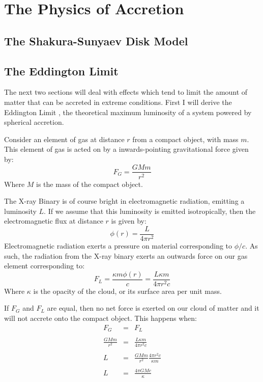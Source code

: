 \chapter{The Physics of Accretion}

\label{sec:PhysAcc}

\section{The Shakura-Sunyaev Disk Model}

\section{The Eddington Limit}

\par The next two sections will deal with effects which tend to limit the amount of matter that can be accreted in extreme conditions.  First I will derive the Eddington Limit \citep{xxxxx}, the theoretical maximum luminosity of a system powered by spherical accretion.
\par Consider an element of gas at distance $r$ from a compact object, with mass $m$.  This element of gas is acted on by a inwards-pointing gravitational force given by:
\begin{equation}
F_G=\frac{GMm}{r^2}
\end{equation}
Where $M$ is the mass of the compact object.
\par The X-ray Binary is of course bright in electromagnetic radiation, emitting a luminosity $L$.  If we assume that this luminosity is emitted isotropically, then the electromagnetic flux at distance $r$ is given by:
\begin{equation}
\phi(r)=\frac{L}{4\pi r^2}
\end{equation}
Electromagnetic radiation exerts a pressure on material corresponding to $\phi/c$.  As such, the radiation from the X-ray binary exerts an outwards force on our gas element corresponding to:
\begin{equation}
F_L=\frac{\kappa m\phi(r)}{c}=\frac{L\kappa m}{4\pi r^2c}
\end{equation}
Where $\kappa$ is the opacity of the cloud, or its surface area per unit mass.
\par If $F_G$ and $F_L$ are equal, then no net force is exerted on our cloud of matter and it will not accrete onto the compact object.  This happens when:
\begin{eqnarray}
F_G&=&F_L\\ \nonumber \\
\frac{GMm}{r^2}&=&\frac{L\kappa m}{4\pi r^2c} \\ \nonumber \\
L&=&\frac{GMm}{r^2}\frac{4\pi r^2c}{\kappa m} \\ \nonumber \\
L&=&\frac{4\pi GMc}{\kappa}
\end{eqnarray}

